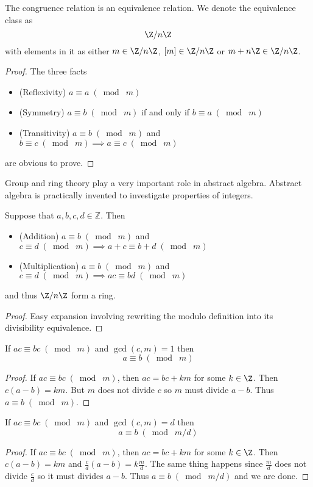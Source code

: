 \begin{prp}{}{} The congruence relation is an equivalence relation. We denote the equivalence class as $$\Z/n\Z$$ with elements in it as either $m\in\Z/n\Z$, $[m]\in\Z/n\Z$ or $m+n\Z\in\Z/n\Z$. \tcbline
\begin{proof} The three facts
\begin{itemize}
\item (Reflexivity) $a\equiv a\;(\bmod\;m)$
\item (Symmetry) $a\equiv b\;(\bmod\;m)$ if and only if $b\equiv a\;(\bmod\;m)$
\item (Transitivity) $a\equiv b\;(\bmod\;m)$ and $b\equiv c\;(\bmod\;m)\implies a\equiv c\;(\bmod\;m)$
\end{itemize}
are obvious to prove. 
\end{proof}
\end{prp}

Group and ring theory play a very important role in abstract algebra. Abstract algebra is practically invented to investigate properties of integers. 

\begin{prp}{}{} Suppose that $a,b,c,d\in\mathbb{Z}$. Then
\begin{itemize}
\item (Addition) $a\equiv b\;(\bmod\;m)$ and $c\equiv d\;(\bmod\;m)\implies a+c\equiv b+d\;(\bmod\;m)$
\item (Multiplication) $a\equiv b\;(\bmod\;m)$ and $c\equiv d\;(\bmod\;m)\implies ac\equiv bd\;(\bmod\;m)$
\end{itemize} and thus $\Z/n\Z$ form a ring. \tcbline
\begin{proof}
Easy expansion involving rewriting the modulo definition into its divisibility equivalence. 
\end{proof}
\end{prp}

\begin{prp}{}{} If $ac\equiv bc\;(\bmod\;m)$ and $\gcd(c,m)=1$ then $$a\equiv b\;(\bmod\;m)$$ \tcbline
\begin{proof}
If $ac\equiv bc\;(\bmod\;m)$, then $ac=bc+km$ for some $k\in\Z$. Then $c(a-b)=km$. But $m$ does not divide $c$ so $m$ must divide $a-b$. Thus $a\equiv b\;(\bmod\;m)$. 
\end{proof}
\end{prp}

\begin{prp}{}{} If $ac\equiv bc\;(\bmod\;m)$ and $\gcd(c,m)=d$ then $$a\equiv b\;(\bmod\;m/d)$$ \tcbline
\begin{proof}
If $ac\equiv bc\;(\bmod\;m)$, then $ac=bc+km$ for some $k\in\Z$. Then $c(a-b)=km$ and $\frac{c}{d}(a-b)=k\frac{m}{d}$. The same thing happens since $\frac{m}{d}$ does not divide $\frac{c}{d}$ so it must divides $a-b$. Thus $a\equiv b\;(\bmod\;m/d)$ and we are done. 
\end{proof}
\end{prp}

